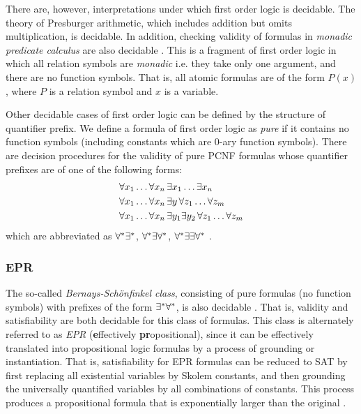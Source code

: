 \documentclass[10pt]{article}
\begin{document}
There are, however, interpretations under which first order logic is decidable. The theory of Presburger arithmetic, which includes addition but omits multiplication, is decidable. In addition, checking validity of formulas in \textit{monadic predicate calculus} are also decidable \cite{lewis1980complexity}. This is a fragment of first order logic in which all relation symbols are \textit{monadic} i.e. they take only one argument, and there are no function symbols. That is, all atomic formulas are of the form $P(x)$, where $P$ is a relation symbol and $x$ is a variable.

Other decidable cases of first order logic can be defined by the structure of quantifier prefix. We define a formula of first order logic as \textit{pure} if it contains no function symbols (including constants which are 0-ary function symbols). There are decision procedures for the validity of pure PCNF formulas whose quantifier prefixes are of one of the following forms:
\begin{align}
    &\forall x_1\dots\forall x_n \,\exists x_1\dots\exists x_n \\
    &\forall x_1\dots\forall x_n \, \exists y \, \forall z_1\dots\forall z_m \\
    &\forall x_1\dots\forall x_n \, \exists y_1 \exists y_2 \, \forall z_1\dots\forall z_m 
\end{align}  
which are abbreviated as $\forall^*\exists^*$, $\forall^*\exists\forall^*$, $\forall^*\exists\exists\forall^*$ \cite{Dreben1979TheDP}. 

\subsubsection*{EPR}

The so-called \textit{Bernays-Sch\"{o}nfinkel class}, consisting of pure formulas (no function symbols) with prefixes of the form $\exists^*\forall^*$, is also decidable \cite{lewis1980complexity}. That is, validity and satisfiability are both decidable for this class of formulas. This class is alternately referred to as \textit{EPR} (\textbf{e}ffectively \textbf{pr}opositional), since it can be effectively translated into propositional logic formulas by a process of grounding or instantiation. That is, satisfiability for EPR formulas can be reduced to SAT by first replacing all existential variables by Skolem constants, and then grounding the universally quantified variables by all combinations of constants. This process produces a propositional formula that is exponentially larger than the original \cite{demoura2008deciding}.
\end{document}
